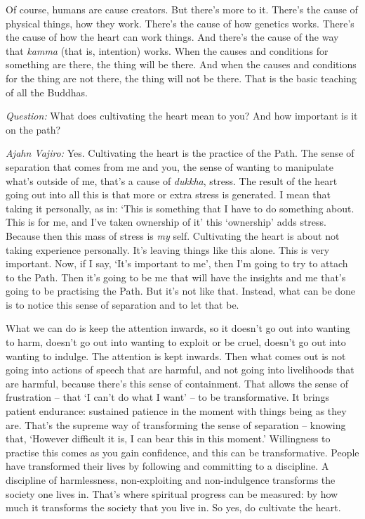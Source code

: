 \enlargethispage{\baselineskip}

Of course, humans are cause creators. But there's more to it. There's the cause
of physical things, how they work. There's the cause of how genetics works.
There's the cause of how the heart can work things. And there's the cause of the
way that \emph{kamma} (that is, intention) works. When the causes and conditions
for something are there, the thing will be there. And when the causes and
conditions for the thing are not there, the thing will not be there. That is the
basic teaching of all the Buddhas.

\bigskip

\emph{Question:} What does cultivating the heart mean to you? And how important is it
on the path?

\emph{Ajahn Vajiro:} Yes. Cultivating the heart is the practice of the Path. The sense
of separation that comes from me and you, the sense of wanting to manipulate
what's outside of me, that's a cause of \emph{dukkha}, stress. The result of the
heart going out into all this is that more or extra stress is generated. I mean that
taking it personally, as in: `This is something that I have to do something
about. This is for me, and I've taken ownership of it' this `ownership' adds
stress. Because then this mass of stress is \emph{my} self. Cultivating the
heart is about not taking experience personally. It's leaving things like this
alone. This is very important. Now, if I say, `It's important to me', then I'm
going to try to attach to the Path. Then it's going to be me that will have the
insights and me that's going to be practising the Path. But it's not like that.
Instead, what can be done is to notice this sense of separation and to let that
be.

What we can do is keep the attention inwards, so it doesn't go out into wanting
to harm, doesn't go out into wanting to exploit or be cruel, doesn't go out into
wanting to indulge. The attention is kept inwards. Then what comes out is not
going into actions of speech that are harmful, and not going into livelihoods
that are harmful, because there's this sense of containment. That allows the
sense of frustration -- that `I can't do what I want' -- to be transformative.
It brings patient endurance: sustained patience in the moment with things being as they
are. That's the supreme way of transforming the sense of separation -- knowing
that, `However difficult it is, I can bear this in this moment.' Willingness to
practise this comes as you gain confidence, and this can be transformative.
People have transformed their lives by following and committing to a discipline.
A discipline of harmlessness, non-exploiting and non-indulgence transforms the
society one lives in. That's where spiritual progress can be measured: by how
much it transforms the society that you live in. So yes, do cultivate the heart.

